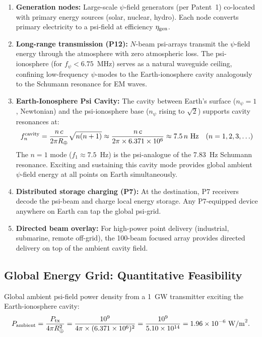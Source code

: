\documentclass[aps,prd,twocolumn,superscriptaddress]{revtex4-2}
\newcommand{\npsi}{n_\psi}
\begin{document}
\begin{enumerate}
  \item \textbf{Generation nodes:} Large-scale $\psi$-field generators
    (per Patent~1) co-located with primary energy sources (solar, nuclear,
    hydro).  Each node converts primary electricity to a psi-field
    at efficiency $\eta_{\rm gen}$.
  \item \textbf{Long-range transmission (P12):} $N$-beam psi-arrays
    transmit the $\psi$-field energy through the atmosphere with zero
    atmospheric loss.  The psi-ionosphere (for $f_\psi < 6.75$~MHz)
    serves as a natural waveguide ceiling, confining low-frequency
    $\psi$-modes to the Earth-ionosphere cavity analogously to the
    Schumann resonance for EM waves.
  \item \textbf{Earth-Ionosphere Psi Cavity:} The cavity between Earth's
    surface ($\npsi = 1$, Newtonian) and the psi-ionosphere base
    ($\npsi$ rising to $\sqrt{2}$) supports cavity resonances at:
    \begin{equation}
    f_n^{\rm cavity} = \frac{n\,c}{2\pi R_\oplus}
    \sqrt{n(n+1)}
    \approx \frac{n\,c}{2\pi \times 6.371\times10^6}
    \approx 7.5\,n~\text{Hz} \quad (n=1,2,3,\ldots)
    \end{equation}
    The $n=1$ mode ($f_1 \approx 7.5$~Hz) is the psi-analogue of
    the 7.83~Hz Schumann resonance.  Exciting and sustaining this
    cavity mode provides global ambient $\psi$-field energy at all
    points on Earth simultaneously.
  \item \textbf{Distributed storage charging (P7):} At the destination,
    P7 receivers decode the psi-beam and charge local energy storage.
    Any P7-equipped device anywhere on Earth can tap the global psi-grid.
  \item \textbf{Directed beam overlay:} For high-power point delivery
    (industrial, submarine, remote off-grid), the 100-beam focused
    array provides directed delivery on top of the ambient cavity field.
\end{enumerate}

\subsection{Global Energy Grid: Quantitative Feasibility}

Global ambient psi-field power density from a 1~GW transmitter
exciting the Earth-ionosphere cavity:
\begin{equation}
P_{\rm ambient} = \frac{P_{\rm tx}}{4\pi R_\oplus^2}
= \frac{10^9}{4\pi\times(6.371\times10^6)^2}
= \frac{10^9}{5.10\times10^{14}}
= 1.96\times10^{-6}~\text{W/m}^2.
\end{equation}
\end{document}
